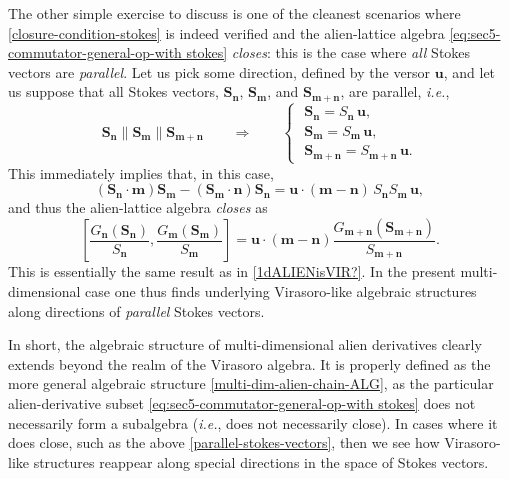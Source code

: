 \documentclass[11pt,a4paper]{article}
\newcommand{\be}{\begin{equation}}
\newcommand{\ee}{\end{equation}}
\begin{document}
The other simple exercise to discuss is one of the cleanest scenarios where \eqref{closure-condition-stokes} is indeed verified and the alien-lattice algebra \eqref{eq:sec5-commutator-general-op-with stokes} \textit{closes}: this is the case where \textit{all} Stokes vectors are \textit{parallel}. Let us pick some direction, defined by the versor $\boldsymbol{u}$, and let us suppose that all Stokes vectors, $\boldsymbol{S}_{\boldsymbol{n}}$, $\boldsymbol{S}_{\boldsymbol{m}}$, and $\boldsymbol{S}_{\boldsymbol{m}+\boldsymbol{n}}$, are parallel, \textit{i.e.},
%
\be
\label{parallel-stokes-vectors}
\boldsymbol{S}_{\boldsymbol{n}} \parallel \boldsymbol{S}_{\boldsymbol{m}} \parallel \boldsymbol{S}_{\boldsymbol{m}+\boldsymbol{n}} \qquad \Rightarrow \qquad
\begin{cases}
\,\, \boldsymbol{S}_{\boldsymbol{n}} = S_{\boldsymbol{n}}\, \boldsymbol{u}, \\
\,\, \boldsymbol{S}_{\boldsymbol{m}} = S_{\boldsymbol{m}}\, \boldsymbol{u}, \\
\,\, \boldsymbol{S}_{\boldsymbol{m}+\boldsymbol{n}} = S_{\boldsymbol{m}+\boldsymbol{n}}\, \boldsymbol{u}.
\end{cases}
\ee
%
\noindent
This immediately implies that, in this case,
%
\be
\left( \boldsymbol{S}_{\boldsymbol{n}} \cdot \boldsymbol{m} \right) \boldsymbol{S}_{\boldsymbol{m}} - \left( \boldsymbol{S}_{\boldsymbol{m}} \cdot \boldsymbol{n} \right) \boldsymbol{S}_{\boldsymbol{n}} = \boldsymbol{u} \cdot \left( \boldsymbol{m} - \boldsymbol{n} \right)\, S_{\boldsymbol{n}} S_{\boldsymbol{m}}\, \boldsymbol{u},
\ee
%
\noindent
and thus the alien-lattice algebra \textit{closes} as
%
\be
\left[ \frac{G_{\boldsymbol{n}} (\boldsymbol{S}_{\boldsymbol{n}})}{S_{\boldsymbol{n}}}, \frac{G_{\boldsymbol{m}} (\boldsymbol{S}_{\boldsymbol{m}})}{S_{\boldsymbol{m}}} \right] = \boldsymbol{u} \cdot \left( \boldsymbol{m} - \boldsymbol{n} \right) \frac{G_{\boldsymbol{m}+\boldsymbol{n}} (\boldsymbol{S}_{\boldsymbol{m}+\boldsymbol{n}})}{S_{\boldsymbol{m}+\boldsymbol{n}}}.
\ee
%
\noindent
This is essentially the same result as in \eqref{1dALIENisVIR?}. In the present multi-dimensional case one thus finds underlying Virasoro-like algebraic structures along directions of \textit{parallel} Stokes vectors.

In short, the algebraic structure of multi-dimensional alien derivatives clearly extends beyond the realm of the Virasoro algebra. It is properly defined as the more general algebraic structure \eqref{multi-dim-alien-chain-ALG}, as the particular alien-derivative subset \eqref{eq:sec5-commutator-general-op-with stokes} does not necessarily form a subalgebra (\textit{i.e.}, does not necessarily close). In cases where it does close, such as the above \eqref{parallel-stokes-vectors}, then we see how Virasoro-like structures reappear along special directions in the space of Stokes vectors.
\end{document}
